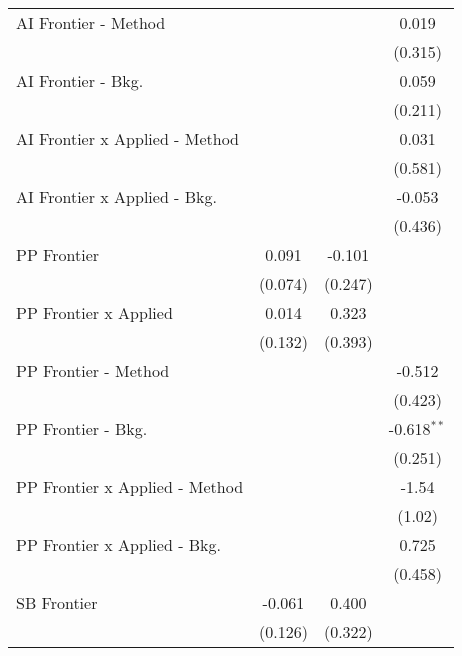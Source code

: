 \begin{tabular}{lccc}
   AI Frontier - Method           &               &               & 0.019\\   
                                  &               &               & (0.315)\\   
   AI Frontier - Bkg.             &               &               & 0.059\\   
                                  &               &               & (0.211)\\   
   AI Frontier x Applied - Method &               &               & 0.031\\   
                                  &               &               & (0.581)\\   
   AI Frontier x Applied - Bkg.   &               &               & -0.053\\   
                                  &               &               & (0.436)\\   
   PP Frontier                    & 0.091         & -0.101        &   \\   
                                  & (0.074)       & (0.247)       &   \\   
   PP Frontier x Applied          & 0.014         & 0.323         &   \\   
                                  & (0.132)       & (0.393)       &   \\   
   PP Frontier - Method           &               &               & -0.512\\   
                                  &               &               & (0.423)\\   
   PP Frontier - Bkg.             &               &               & -0.618$^{**}$\\   
                                  &               &               & (0.251)\\   
   PP Frontier x Applied - Method &               &               & -1.54\\   
                                  &               &               & (1.02)\\   
   PP Frontier x Applied - Bkg.   &               &               & 0.725\\   
                                  &               &               & (0.458)\\   
   SB Frontier                    & -0.061        & 0.400         &   \\   
                                  & (0.126)       & (0.322)       &   \\   

\end{tabular}
